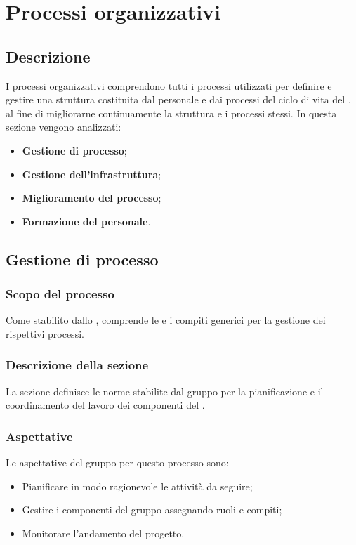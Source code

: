 \section{Processi organizzativi}
\label{PO}
\subsection{Descrizione}\label{PO_Descrizione}
I processi organizzativi comprendono tutti i processi utilizzati per definire e gestire una struttura costituita dal personale e dai processi del ciclo di vita del , al fine di migliorarne continuamente la struttura e i processi stessi. 
In questa sezione vengono analizzati:
\begin{itemize}
	\item \textbf{Gestione di processo};
	\item \textbf{Gestione dell'infrastruttura};
	\item \textbf{Miglioramento del processo};
	\item \textbf{Formazione del personale}.
\end{itemize}

\subsection{Gestione di processo}
\subsubsection{Scopo del processo}\label{PO_GestioneProcesso_Scopo}
Come stabilito dallo  , comprende le  e i compiti generici per la gestione dei rispettivi processi.

\subsubsection{Descrizione della sezione}
La sezione definisce le norme stabilite dal gruppo per la pianificazione e il coordinamento del lavoro dei componenti del .

\subsubsection{Aspettative}
Le aspettative del gruppo per questo processo sono:
\begin{itemize}
	\item Pianificare in modo ragionevole le attività da seguire;
	\item Gestire i componenti del gruppo assegnando ruoli e compiti;
	\item Monitorare l'andamento del progetto.
\end{itemize}

